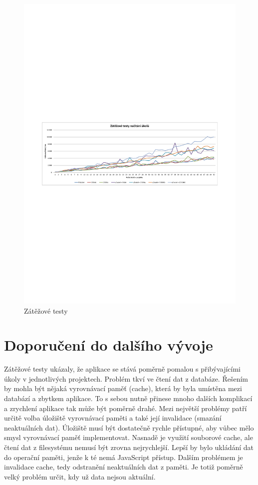 \begin{figure}[h]
	\includegraphics[trim=0cm 11cm 0cm 11cm, clip, width=17cm]{figures/zatezove-testy}
	\caption{Zátěžové testy}
	\label{fig:load-tests}
\end{figure}

\section{Doporučení do dalšího vývoje}

Zátěžové testy ukázaly, že aplikace se stává poměrně pomalou s přibývajícími úkoly v jednotlivých projektech. Problém tkví ve čtení dat z databáze. Řešením by mohla být nějaká vyrovnávací paměť (cache), která by byla umístěna mezi databází a zbytkem aplikace. To s sebou nutně přinese mnoho dalších komplikací a zrychlení aplikace tak může být poměrně drahé. Mezi největší problémy patří určitě volba úložiště vyrovnávací paměti a také její invalidace (smazání neaktuálních dat). Úložiště musí být dostatečně rychle přístupné, aby vůbec mělo smysl vyrovnávací paměť implementovat. Nasnadě je využití souborové cache, ale čtení dat z filesystému nemusí být zrovna nejrychlejší. Lepší by bylo ukládání dat do operační paměti, jenže k té nemá JavaScript přístup. Dalším problémem je invalidace cache, tedy odstranění neaktuálních dat z paměti. Je totiž poměrně velký problém určit, kdy už data nejsou aktuální.

